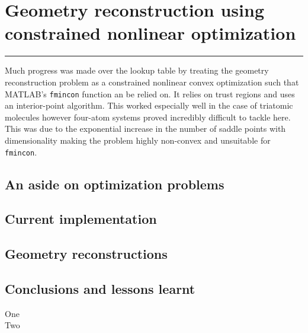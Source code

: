 \chapter{Geometry reconstruction using constrained nonlinear optimization}\label{ch:optimization}

\vspace{-1.5 em}
\begin{addmargin}[-0.5cm]{0cm}
  \minitoc
\end{addmargin}
\hrule
\vspace{1.5 em}

Much progress was made over the lookup table by treating the geometry reconstruction problem as a constrained nonlinear convex optimization such that MATLAB's \texttt{fmincon} function an be relied on. It relies on trust regions and uses an interior-point algorithm. This worked especially well in the case of triatomic molecules however four-atom systems proved incredibly difficult to tackle here. This was due to the exponential increase in the number of saddle points with dimensionality \footnotemark making the problem highly non-convex and unsuitable for \texttt{fmincon}.


\section{An aside on optimization problems}

\section{Current implementation}

\section{Geometry reconstructions}

\section{Conclusions and lessons learnt}

\begin{description}
  \item [One]
  \item [Two]
\end{description}

